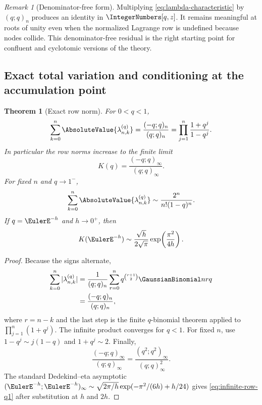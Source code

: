 \documentclass[11pt,a4paper,oneside]{article}
\newtheorem{theorem}{Theorem}[section]
\theoremstyle{definition}
\theoremstyle{remark}
\newtheorem{remark}[remark]{Remark}
\begin{document}
\begin{remark}[Denominator-free form]
Multiplying \eqref{eq:lambda-characteristic} by $(q;q)_n$ produces an identity
in $\IntegerNumbers[q,z]$.  It remains meaningful at roots of unity even when the normalized
Lagrange row is undefined because nodes collide.  This denominator-free
residual is the right starting point for confluent and cyclotomic versions of
the theory.
\end{remark}

\subsection{Exact total variation and conditioning at the accumulation point}

\begin{theorem}[Exact row norm]
\label{thm:row-norm}
For $0<q<1$,
\begin{equation}
 \sum_{k=0}^n\AbsoluteValue{\lambda_{n,k}^{(q)}}
 =\frac{(-q;q)_n}{(q;q)_n}
 =\prod_{j=1}^n\frac{1+q^j}{1-q^j}.
 \label{eq:row-norm}
\end{equation}
In particular the row norms increase to the finite limit
\begin{equation}
 K(q)=\frac{(-q;q)_\infty}{(q;q)_\infty}.
 \label{eq:row-norm-limit}
\end{equation}
For fixed $n$ and $q\to1^-$,
\begin{equation}
 \sum_{k=0}^n\AbsoluteValue{\lambda_{n,k}^{(q)}}
 \sim\frac{2^n}{n!(1-q)^n}.
 \label{eq:finite-row-q1}
\end{equation}
If $q=\EulerE^{-h}$ and $h\to0^+$, then
\begin{equation}
 K(\EulerE^{-h})
 \sim\frac{\sqrt h}{2\sqrt\pi}
 \exp\!\left(\frac{\pi^2}{4h}\right).
 \label{eq:infinite-row-q1}
\end{equation}
\end{theorem}

\begin{proof}
Because the signs alternate,
\begin{align*}
 \sum_{k=0}^n|\lambda_{n,k}^{(q)}|
 &=\frac1{(q;q)_n}\sum_{r=0}^n
 q^{\binom{r+1}{2}}\GaussianBinomial nrq\\
 &=\frac{(-q;q)_n}{(q;q)_n},
\end{align*}
where $r=n-k$ and the last step is the finite $q$-binomial theorem applied to
$\prod_{j=1}^n(1+q^j)$.  The infinite product converges for $q<1$.
For fixed $n$, use $1-q^j\sim j(1-q)$ and $1+q^j\sim2$.
Finally,
\[
 \frac{(-q;q)_\infty}{(q;q)_\infty}
 =\frac{(q^2;q^2)_\infty}{(q;q)_\infty^2}.
\]
The standard Dedekind--eta asymptotic
$(\EulerE^{-h};\EulerE^{-h})_\infty\sim
\sqrt{2\pi/h}\exp(-\pi^2/(6h)+h/24)$ gives
\eqref{eq:infinite-row-q1} after substitution at $h$ and $2h$.
\end{proof}
\end{document}
